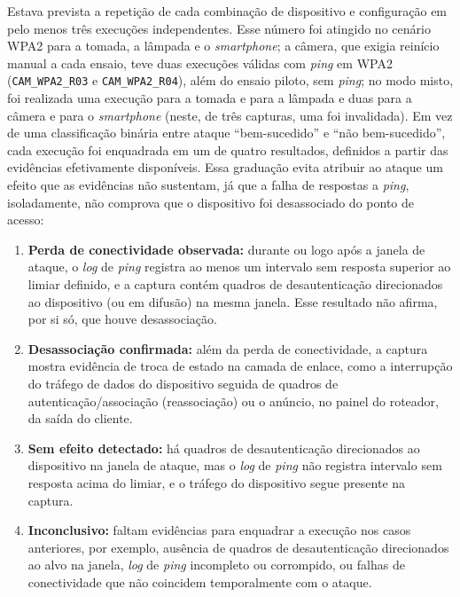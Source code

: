 Estava prevista a repetição de cada combinação de dispositivo e configuração em pelo menos três execuções independentes. Esse número foi atingido no cenário WPA2 para a tomada, a lâmpada e o \textit{smartphone}; a câmera, que exigia reinício manual a cada ensaio, teve duas execuções válidas com \textit{ping} em WPA2 (\texttt{CAM\_WPA2\_R03} e \texttt{CAM\_WPA2\_R04}), além do ensaio piloto, sem \textit{ping}; no modo misto, foi realizada uma execução para a tomada e para a lâmpada e duas para a câmera e para o \textit{smartphone} (neste, de três capturas, uma foi invalidada). Em vez de uma classificação binária entre ataque ``bem-sucedido'' e ``não bem-sucedido'', cada execução foi enquadrada em um de quatro resultados, definidos a partir das evidências efetivamente disponíveis. Essa graduação evita atribuir ao ataque um efeito que as evidências não sustentam, já que a falha de respostas a \textit{ping}, isoladamente, não comprova que o dispositivo foi desassociado do ponto de acesso:

\begin{enumerate}
    \item \textbf{Perda de conectividade observada:} durante ou logo após a janela de ataque, o \textit{log} de \textit{ping} registra ao menos um intervalo sem resposta superior ao limiar definido, e a captura contém quadros de desautenticação direcionados ao dispositivo (ou em difusão) na mesma janela. Esse resultado não afirma, por si só, que houve desassociação.
    \item \textbf{Desassociação confirmada:} além da perda de conectividade, a captura mostra evidência de troca de estado na camada de enlace, como a interrupção do tráfego de dados do dispositivo seguida de quadros de autenticação/associação (reassociação) ou o anúncio, no painel do roteador, da saída do cliente.
    \item \textbf{Sem efeito detectado:} há quadros de desautenticação direcionados ao dispositivo na janela de ataque, mas o \textit{log} de \textit{ping} não registra intervalo sem resposta acima do limiar, e o tráfego do dispositivo segue presente na captura.
    \item \textbf{Inconclusivo:} faltam evidências para enquadrar a execução nos casos anteriores, por exemplo, ausência de quadros de desautenticação direcionados ao alvo na janela, \textit{log} de \textit{ping} incompleto ou corrompido, ou falhas de conectividade que não coincidem temporalmente com o ataque.
\end{enumerate}

